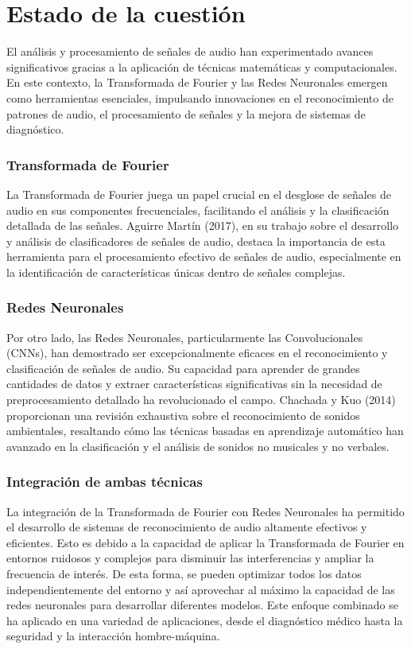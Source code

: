 \section{Estado de la cuestión}
El análisis y procesamiento de señales de audio han experimentado avances significativos gracias a la aplicación de técnicas matemáticas y computacionales. En este contexto, la Transformada de Fourier y las Redes Neuronales emergen como herramientas esenciales, impulsando innovaciones en el reconocimiento de patrones de audio, el procesamiento de señales y la mejora de sistemas de diagnóstico.
\subsubsection*{Transformada de Fourier}
La Transformada de Fourier juega un papel crucial en el desglose de señales de audio en sus componentes frecuenciales, facilitando el análisis y la clasificación detallada de las señales. Aguirre Martín (2017), en su trabajo sobre el desarrollo y análisis de clasificadores de señales de audio, destaca la importancia de esta herramienta para el procesamiento efectivo de señales de audio, especialmente en la identificación de características únicas dentro de señales complejas.
\subsubsection*{Redes Neuronales}
Por otro lado, las Redes Neuronales, particularmente las Convolucionales (CNNs), han demostrado ser excepcionalmente eficaces en el reconocimiento y clasificación de señales de audio. Su capacidad para aprender de grandes cantidades de datos y extraer características significativas sin la necesidad de preprocesamiento detallado ha revolucionado el campo. Chachada y Kuo (2014) proporcionan una revisión exhaustiva sobre el reconocimiento de sonidos ambientales, resaltando cómo las técnicas basadas en aprendizaje automático han avanzado en la clasificación y el análisis de sonidos no musicales y no verbales.
\subsubsection*{Integración de ambas técnicas}
La integración de la Transformada de Fourier con Redes Neuronales ha permitido el desarrollo de sistemas de reconocimiento de audio altamente efectivos y eficientes.
Esto es debido a la capacidad de aplicar la Transformada de Fourier en entornos ruidosos y complejos para disminuir las interferencias y ampliar la frecuencia de interés. De esta forma, se pueden optimizar todos los datos independientemente del entorno y así aprovechar al máximo la capacidad de las redes neuronales para desarrollar diferentes modelos.
Este enfoque combinado se ha aplicado en una variedad de aplicaciones, desde el diagnóstico médico hasta la seguridad y la interacción hombre-máquina.

